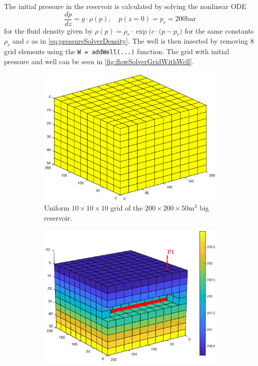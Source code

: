 The initial pressure in the reservoir is calculated by solving the nonlinear ODE
\begin{equation*}
    \frac{dp}{dz} = g\cdot \rho(p), \quad p(z = 0) = p_r = 200\text{bar} 
\end{equation*}  
for the fluid density given by $\rho(p) = \rho_r\cdot\exp\big(c\cdot(p-p_r\big)$ for the same constants $\rho_r$ and $c$ as in \autoref{eq:pressureSolverDensity}. The well is then inserted by removing 8 grid elements using the \texttt{W = addWell(...)} function. The grid with initial pressure and well can be seen in \autoref{fig:flowSolverGridWithWell}.
\begin{figure}[htbp]
    \centering
    \begin{subfigure}[t]{0.48\textwidth}
        \centering
        \includegraphics[width = \textwidth]{figures/flowSolver_grid.eps}
        \caption{Uniform $10\times 10 \times 10$ grid of the $200\times 200 \times 50 \text{m}^3$ big reservoir.}
        \label{fig:flowSolverGrid}
    \end{subfigure}
    \hfill
    \begin{subfigure}[t]{0.48\textwidth}
        \centering
        \includegraphics[width = \textwidth]{figures/flowSolver_gridWithWell.eps}

\end{subfigure}
\end{figure}
